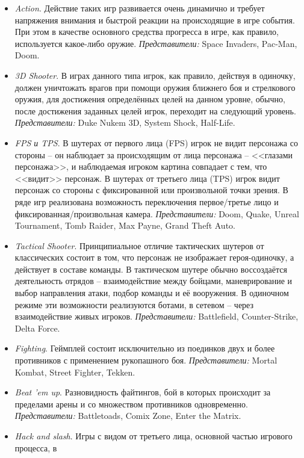\begin{itemize}
    \item \emph{Action}. Действие таких игр развивается очень динамично и требует напряжения внимания и 
        быстрой реакции на происходящие в игре события. При этом в качестве основного средства прогресса 
        в игре, как правило, используется какое-либо оружие. \emph{Представители:} Space Invaders, 
        Pac-Man, Doom. 
    \item \emph{3D Shooter}. В играх данного типа игрок, как правило, действуя в одиночку, должен 
        уничтожать врагов при помощи оружия ближнего боя и стрелкового оружия, для достижения определённых 
        целей на данном уровне, обычно, после достижения заданных целей игрок, переходит на следующий 
        уровень. \emph{Представители:} Duke Nukem 3D, System Shock, Half-Life.
    \item \emph{FPS и TPS}. В шутерах от первого лица (FPS) игрок не видит персонажа со стороны -- он 
        наблюдает за происходящим от лица персонажа -- <<глазами персонажа>>, и наблюдаемая игроком 
        картина совпадает с тем, что <<видит>> персонаж. В шутерах от третьего лица (TPS) игрок видит 
        персонаж со стороны с фиксированной или произвольной точки зрения. В ряде игр реализована 
        возможность переключения первое/третье лицо и фиксированная/произвольная камера. 
        \emph{Представители:} Doom, Quake, Unreal Tournament, Tomb Raider, Max Payne, Grand Theft Auto.
    \item \emph{Tactical Shooter}. Принципиальное отличие тактических шутеров от классических состоит в 
        том, что персонаж не изображает героя-одиночку, а действует в составе команды. В тактическом 
        шутере обычно воссоздаётся деятельность отрядов -- взаимодействие между бойцами, маневрирование и 
        выбор направления атаки, подбор команды и её вооружения. В одиночном режиме эти возможности 
        реализуются ботами, в сетевом -- через взаимодействие живых игроков. \emph{Представители:} 
        Battlefield, Counter-Strike, Delta Force.
    \item \emph{Fighting}. Геймплей состоит исключительно из поединков двух и более противников с 
        применением рукопашного боя. \emph{Представители:} Mortal Kombat, Street Fighter, Tekken.
    \item \emph{Beat ’em up}. Разновидность файтингов, бой в которых происходит за пределами арены и со 
        множеством противников одновременно. \emph{Представители:} Battletoads, Comix Zone, Enter the Matrix.
    \item \emph{Hack and slash}. Игры с видом от третьего лица, основной частью игрового процесса, в 

\end{itemize}
